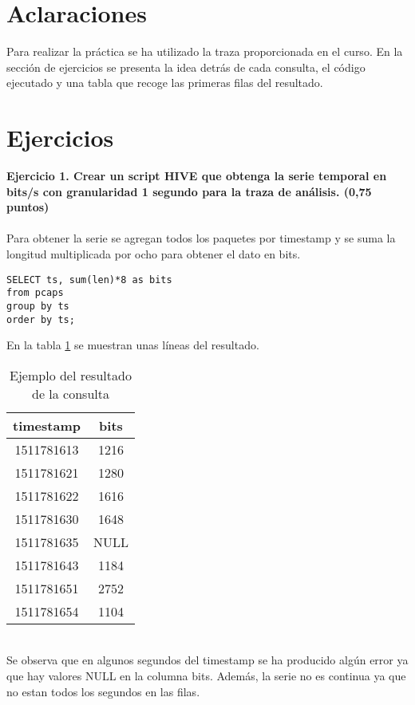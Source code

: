 \section*{Aclaraciones}
Para realizar la práctica se ha utilizado la traza proporcionada en el curso. En la sección de ejercicios se presenta la idea detrás de cada consulta, el código ejecutado y una tabla que recoge las primeras filas del resultado.
\section*{Ejercicios}
\textbf{Ejercicio 1. Crear un script HIVE que obtenga la serie temporal en bits/s con granularidad 1 segundo para la traza de análisis. (0,75 puntos)}\\\\
Para obtener la serie se agregan todos los paquetes por timestamp y se suma la longitud multiplicada por ocho para obtener el dato en bits.
\begin{lstlisting}[caption=Consulta para obtener la serie]
SELECT ts, sum(len)*8 as bits
from pcaps 
group by ts 
order by ts;
\end{lstlisting}
En la tabla \ref{tab:c1} se muestran unas líneas del resultado.
\begin{table}[ht]
	\centering
	\caption{Ejemplo del resultado de la consulta}
	\begin{tabular}[t]{cc}
		timestamp & bits \\
		\hline
		1511781613 & 1216 \\
		1511781621 & 1280 \\
		1511781622 & 1616 \\
		1511781630 &1648 \\
		1511781635 & NULL \\
		1511781643 & 1184 \\
		1511781651 & 2752 \\
		1511781654 & 1104 \\
	\end{tabular}
	\label{tab:c1}
\end{table}%
\\
Se observa que en algunos segundos del timestamp se ha producido algún error ya que hay valores NULL en la columna bits. Además, la serie no es continua ya que no estan todos los segundos en las filas. \\\\
